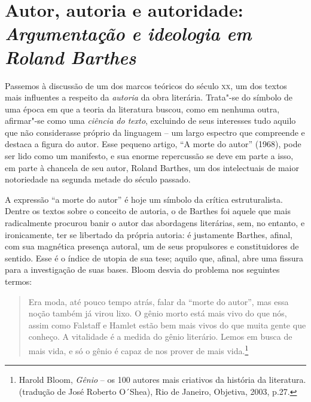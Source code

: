 \chapter*{Autor, autoria e autoridade:\\ \emph{\large Argumentação e ideologia em Roland Barthes}}




Passemos à discussão de um dos marcos teóricos do século \textsc{xx}, um
dos textos mais influentes a respeito da \emph{autoria} da obra
literária. Trata"-se do símbolo de uma época em que a teoria da
literatura buscou, como em nenhuma outra, afirmar"-se como uma
\emph{ciência do texto}, excluindo de seus interesses tudo aquilo que
não considerasse próprio da linguagem -- um largo espectro que
compreende e destaca a figura do autor. Esse pequeno artigo, ``A morte
do autor'' (1968), pode ser lido como um manifesto, e sua enorme
repercussão se deve em parte a isso, em parte à chancela de seu autor,
Roland Barthes, um dos intelectuais de maior notoriedade na segunda
metade do século passado.

A expressão ``a morte do autor'' é hoje um símbolo da crítica
estruturalista. Dentre os textos sobre o conceito de autoria, o de
Barthes foi aquele que mais radicalmente procurou banir o autor das
abordagens literárias, sem, no entanto, e ironicamente, ter se libertado
da própria autoria: é justamente Barthes, afinal, com sua magnética
presença autoral, um de seus propulsores e constituidores de sentido.
Esse é o índice de utopia de sua tese; aquilo que, afinal, abre uma
fissura para a investigação de suas bases. Bloom desvia do problema nos
seguintes termos:

\begin{quote}
Era moda, até pouco tempo atrás, falar da ``morte do autor'', mas essa
noção também já virou lixo. O gênio morto está mais vivo do que nós,
assim como Falstaff e Hamlet estão bem mais vivos do que muita gente que
conheço. A vitalidade é a medida do gênio literário. Lemos em busca de
mais vida, e só o gênio é capaz de nos prover de mais vida.\footnote{Harold
  Bloom, \emph{Gênio} -- os 100 autores mais criativos da história da
  literatura. (tradução de José Roberto O´Shea), Rio de Janeiro,
  Objetiva, 2003, p.27.}
\end{quote}

